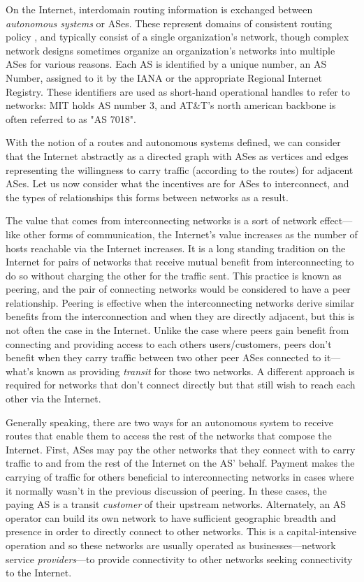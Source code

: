 On the Internet, interdomain routing information is exchanged between \emph{autonomous systems} or ASes. These represent domains of consistent routing policy \cite{RFC1930}, and typically consist of a single organization's network, though complex network designs sometimes organize an organization's networks into multiple ASes for various reasons. Each AS is identified by a unique number, an AS Number, assigned to it by the IANA or the appropriate Regional Internet Registry. These identifiers are used as short-hand operational handles to refer to networks: MIT holds AS number 3, and AT\&T's north american backbone is often referred to as "AS 7018".

With the notion of a routes and autonomous systems defined, we can consider that the Internet abstractly as a directed graph with ASes as vertices and edges representing the willingness to carry traffic (according to the routes) for adjacent ASes. Let us now consider what the incentives are for ASes to interconnect, and the types of relationships this forms between networks as a result.

The value that comes from interconnecting networks is a sort of network effect---like other forms of communication, the Internet's value increases as the number of hosts reachable via the Internet increases. It is a long standing tradition on the Internet for pairs of networks that receive mutual benefit from interconnecting to do so without charging the other for the traffic sent. This practice is known as peering, and the pair of connecting networks would be considered to have a peer relationship. Peering is effective when the interconnecting networks derive similar benefits from the interconnection and when they are directly adjacent, but this is not often the case in the Internet. Unlike the case where peers gain benefit from connecting and providing access to each others users/customers, peers don't benefit when they carry traffic between two other peer ASes connected to it---what's known as providing \emph{transit} for those two networks. A different approach is required for networks that don't connect directly but that still wish to reach each other via the Internet.

Generally speaking, there are two ways for an autonomous system to receive routes that enable them to access the rest of the networks that compose the Internet. First, ASes may pay the other networks that they connect with to carry traffic to and from the rest of the Internet on the AS' behalf. Payment makes the carrying of traffic for others beneficial to interconnecting networks in cases where it normally wasn't in the previous discussion of peering. In these cases, the paying AS is a transit \emph{customer} of their upstream networks. Alternately, an AS operator can build its own network to have sufficient geographic breadth and presence in order to directly connect to other networks. This is a capital-intensive operation and so these networks are usually operated as businesses---network service \emph{providers}---to provide connectivity to other networks seeking connectivity to the Internet.

